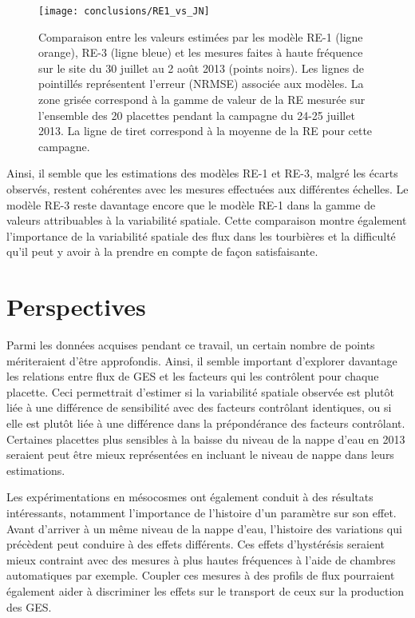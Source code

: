 \begin{figure}
\centering
\texttt{[image: conclusions/RE1\_vs\_JN]}
\caption{Comparaison entre les valeurs estimées par les modèle RE-1 (ligne orange), RE-3 (ligne bleue) et les mesures faites à haute fréquence sur le site du 30 juillet au 2 août 2013 (points noirs). Les lignes de pointillés représentent l'erreur (NRMSE) associée aux modèles. La zone grisée correspond à la gamme de valeur de la RE mesurée sur l'ensemble des 20 placettes pendant la campagne du 24-25 juillet 2013. La ligne de tiret correspond à la moyenne de la RE pour cette campagne.}
\label{fig:RE1_vs_JN}
\end{figure}

Ainsi, il semble que les estimations des modèles RE-1 et RE-3, malgré les écarts observés, restent cohérentes avec les mesures effectuées aux différentes échelles.
Le modèle RE-3 reste davantage encore que le modèle RE-1 dans la gamme de valeurs attribuables à la variabilité spatiale.
Cette comparaison montre également l'importance de la variabilité spatiale des flux dans les tourbières et la difficulté qu'il peut y avoir à la prendre en compte de façon satisfaisante.



\section*{Perspectives}

Parmi les données acquises pendant ce travail, un certain nombre de points mériteraient d'être approfondis.
Ainsi, il semble important d'explorer davantage les relations entre flux de GES et les facteurs qui les contrôlent pour chaque placette.
Ceci permettrait d'estimer si la variabilité spatiale observée est plutôt liée à une différence de sensibilité avec des facteurs contrôlant identiques, ou si elle est plutôt liée à une différence dans la prépondérance des facteurs contrôlant.
Certaines placettes plus sensibles à la baisse du niveau de la nappe d'eau en 2013 seraient peut être mieux représentées en incluant le niveau de nappe dans leurs estimations.

Les expérimentations en mésocosmes ont également conduit à des résultats intéressants, notamment l'importance de l'histoire d'un paramètre sur son effet.
Avant d'arriver à un même niveau de la nappe d'eau, l'histoire des variations qui précèdent peut conduire à des effets différents.
Ces effets d'hystérésis seraient mieux contraint avec des mesures à plus hautes fréquences à l'aide de chambres automatiques par exemple.
Coupler ces mesures à des profils de flux pourraient également aider à discriminer les effets sur le transport de ceux sur la production des GES.

